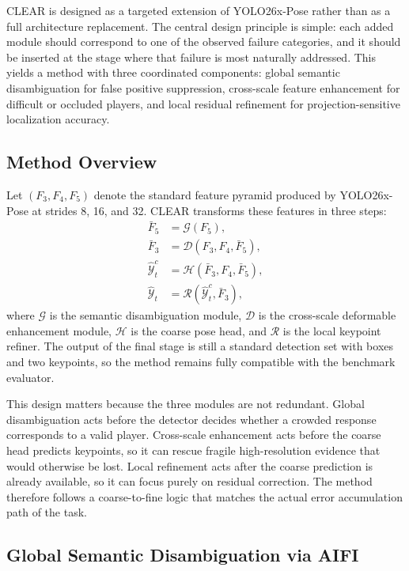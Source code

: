 \documentclass[runningheads]{llncs}
\begin{document}
CLEAR is designed as a targeted extension of YOLO26x-Pose rather than as a full architecture replacement. The central design principle is simple: each added module should correspond to one of the observed failure categories, and it should be inserted at the stage where that failure is most naturally addressed. This yields a method with three coordinated components: global semantic disambiguation for false positive suppression, cross-scale feature enhancement for difficult or occluded players, and local residual refinement for projection-sensitive localization accuracy.

\subsection{Method Overview}
\label{sec:method-overview}

Let $(F_3,F_4,F_5)$ denote the standard feature pyramid produced by YOLO26x-Pose at strides 8, 16, and 32. CLEAR transforms these features in three steps:
\begin{align}
\bar{F}_5 &= \mathcal{G}(F_5), \\
\bar{F}_3 &= \mathcal{D}(F_3,F_4,\bar{F}_5), \\
\hat{\mathcal{Y}}^{c}_t &= \mathcal{H}(\bar{F}_3,F_4,\bar{F}_5), \\
\hat{\mathcal{Y}}_t &= \mathcal{R}(\hat{\mathcal{Y}}^{c}_t,\bar{F}_3),
\end{align}
where $\mathcal{G}$ is the semantic disambiguation module, $\mathcal{D}$ is the cross-scale deformable enhancement module, $\mathcal{H}$ is the coarse pose head, and $\mathcal{R}$ is the local keypoint refiner. The output of the final stage is still a standard detection set with boxes and two keypoints, so the method remains fully compatible with the benchmark evaluator.

This design matters because the three modules are not redundant. Global disambiguation acts before the detector decides whether a crowded response corresponds to a valid player. Cross-scale enhancement acts before the coarse head predicts keypoints, so it can rescue fragile high-resolution evidence that would otherwise be lost. Local refinement acts after the coarse prediction is already available, so it can focus purely on residual correction. The method therefore follows a coarse-to-fine logic that matches the actual error accumulation path of the task.

\subsection{Global Semantic Disambiguation via AIFI}
\label{sec:aifi-p5}
\end{document}
